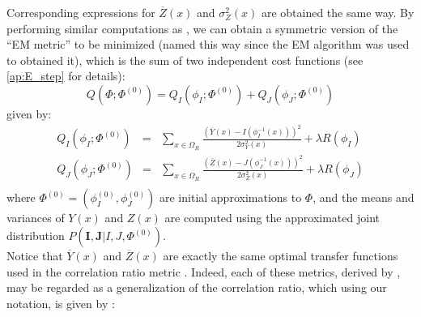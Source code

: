 Corresponding expressions for $\overline{Z}(x)$ and $\sigma_{Z}^{2}(x)$ are obtained the same way. By performing similar computations as \cite{Arce-santana2014}, we can obtain a symmetric version of the ``EM metric'' to be minimized (named this way since the EM algorithm was used to obtained it), which is the sum of two independent cost functions (see \ref{ap:E_step} for details):
\begin{equation}\label{eq:SyNEM_energy}
    Q(\Phi; \Phi^{(0)}) = Q_{I}(\phi_{I}; \Phi^{(0)}) + Q_{J}(\phi_{J}; \Phi^{(0)})
\end{equation}
given by:
\begin{equation}\label{eq:SyNEM_energy_split}
    \begin{array}{lll}
        Q_{I}(\phi_{I}; \Phi^{(0)}) &=& \sum_{x \in \Omega_{R}} \frac{\left(\overline{Y}(x) - I(\phi_{I}^{-1}(x))\right)^{2}}{2\sigma^{2}_{Y}(x)} + \lambda R(\phi_{I}) \\
        Q_{J}(\phi_{J}; \Phi^{(0)}) &=& \sum_{x \in \Omega_{R}} \frac{\left(\overline{Z}(x) - J(\phi_{J}^{-1}(x))\right)^{2}}{2\sigma^{2}_{Z}(x)} + \lambda R(\phi_{J}) \\
    \end{array}
\end{equation}
where $\Phi^{(0)} = (\phi_{I}^{(0)}, \phi_{J}^{(0)})$ are initial approximations to $\Phi$, and the means and variances of $Y(x)$ and $Z(x)$ are computed using the approximated joint distribution $P(\mathbf{I}, \mathbf{J} | I, J, \Phi^{(0)})$.\\

Notice that $\overline{Y}(x)$ and $\overline{Z}(x)$ are exactly the same optimal transfer functions used in the correlation ratio metric \citep{Roche1998, Roche2000}. Indeed, each of these metrics, derived by \cite{Arce-santana2014}, may be regarded as a generalization of the correlation ratio, which using our notation, is given by \citep[see][eq. 3]{Roche1998}:

